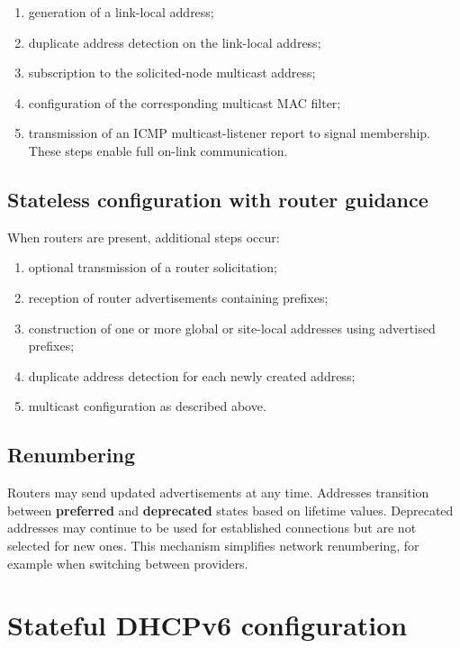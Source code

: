 \begin{enumerate}
\item generation of a link-local address;
\item duplicate address detection on the link-local address;
\item subscription to the solicited-node multicast address;
\item configuration of the corresponding multicast MAC filter;
\item transmission of an ICMP multicast-listener report to signal membership. These steps enable full on-link communication.
\end{enumerate}

\subsection{Stateless configuration with router guidance}

When routers are present, additional steps occur:

\begin{enumerate}
\item optional transmission of a router solicitation;
\item reception of router advertisements containing prefixes;
\item construction of one or more global or site-local addresses using advertised prefixes;
\item duplicate address detection for each newly created address;
\item multicast configuration as described above.
\end{enumerate}

\subsection{Renumbering}

Routers may send updated advertisements at any time. Addresses transition between \textbf{preferred} and \textbf{deprecated} states based on lifetime values. Deprecated addresses may continue to be used for established connections but are not selected for new ones. This mechanism simplifies network renumbering, for example when switching between providers.

\section{Stateful DHCPv6 configuration}

